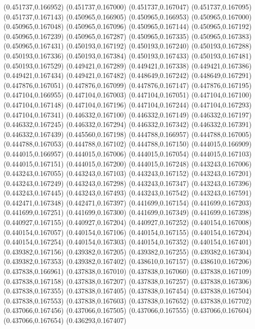 (0.451737,0.166952)
(0.451737,0.167000)
(0.451737,0.167047)
(0.451737,0.167095)
(0.451737,0.167143)
(0.450965,0.166905)
(0.450965,0.166953)
(0.450965,0.167000)
(0.450965,0.167048)
(0.450965,0.167096)
(0.450965,0.167144)
(0.450965,0.167192)
(0.450965,0.167239)
(0.450965,0.167287)
(0.450965,0.167335)
(0.450965,0.167383)
(0.450965,0.167431)
(0.450193,0.167192)
(0.450193,0.167240)
(0.450193,0.167288)
(0.450193,0.167336)
(0.450193,0.167384)
(0.450193,0.167433)
(0.450193,0.167481)
(0.450193,0.167529)
(0.449421,0.167289)
(0.449421,0.167338)
(0.449421,0.167386)
(0.449421,0.167434)
(0.449421,0.167482)
(0.448649,0.167242)
(0.448649,0.167291)
(0.447876,0.167051)
(0.447876,0.167099)
(0.447876,0.167147)
(0.447876,0.167195)
(0.447104,0.166955)
(0.447104,0.167003)
(0.447104,0.167051)
(0.447104,0.167100)
(0.447104,0.167148)
(0.447104,0.167196)
(0.447104,0.167244)
(0.447104,0.167293)
(0.447104,0.167341)
(0.446332,0.167100)
(0.446332,0.167149)
(0.446332,0.167197)
(0.446332,0.167245)
(0.446332,0.167294)
(0.446332,0.167342)
(0.446332,0.167391)
(0.446332,0.167439)
(0.445560,0.167198)
(0.444788,0.166957)
(0.444788,0.167005)
(0.444788,0.167053)
(0.444788,0.167102)
(0.444788,0.167150)
(0.444015,0.166909)
(0.444015,0.166957)
(0.444015,0.167006)
(0.444015,0.167054)
(0.444015,0.167103)
(0.444015,0.167151)
(0.444015,0.167200)
(0.444015,0.167248)
(0.443243,0.167006)
(0.443243,0.167055)
(0.443243,0.167103)
(0.443243,0.167152)
(0.443243,0.167201)
(0.443243,0.167249)
(0.443243,0.167298)
(0.443243,0.167347)
(0.443243,0.167396)
(0.443243,0.167445)
(0.443243,0.167493)
(0.443243,0.167542)
(0.443243,0.167591)
(0.442471,0.167348)
(0.442471,0.167397)
(0.441699,0.167154)
(0.441699,0.167203)
(0.441699,0.167251)
(0.441699,0.167300)
(0.441699,0.167349)
(0.441699,0.167398)
(0.440927,0.167155)
(0.440927,0.167204)
(0.440927,0.167252)
(0.440154,0.167008)
(0.440154,0.167057)
(0.440154,0.167106)
(0.440154,0.167155)
(0.440154,0.167204)
(0.440154,0.167254)
(0.440154,0.167303)
(0.440154,0.167352)
(0.440154,0.167401)
(0.439382,0.167156)
(0.439382,0.167205)
(0.439382,0.167255)
(0.439382,0.167304)
(0.439382,0.167353)
(0.439382,0.167402)
(0.438610,0.167157)
(0.438610,0.167206)
(0.437838,0.166961)
(0.437838,0.167010)
(0.437838,0.167060)
(0.437838,0.167109)
(0.437838,0.167158)
(0.437838,0.167207)
(0.437838,0.167257)
(0.437838,0.167306)
(0.437838,0.167355)
(0.437838,0.167405)
(0.437838,0.167454)
(0.437838,0.167504)
(0.437838,0.167553)
(0.437838,0.167603)
(0.437838,0.167652)
(0.437838,0.167702)
(0.437066,0.167456)
(0.437066,0.167505)
(0.437066,0.167555)
(0.437066,0.167604)
(0.437066,0.167654)
(0.436293,0.167407)
